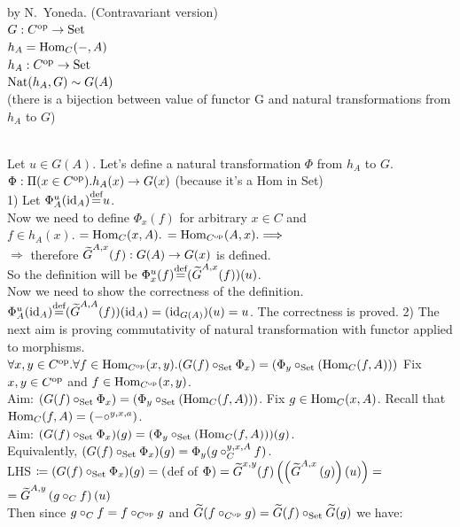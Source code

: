 \documentclass[10pt,a4paper]{article}
\begin{document}
\myqed
\begin{lemma}{by N.~Yoneda. (Contravariant version)}\\
$G : C^{\textrm{op}} \to {\textrm{Set}}$\\
$h_A = {\textrm{Hom}}_C(-,A)$\\
$h_A : C^{\textrm{op}} \to {\textrm{Set}}$\\
${\textrm{Nat}}(h_A,G)\sim G(A)$\\
(there is a bijection between value of functor G and natural transformations from $h_A$ to $G$)
\end{lemma}
\myprf\\
Let $u\in G(A)$. Let's define a natural transformation $\Phi$ from $h_A$ to $G$.\\
$\Phi:\Pi(x\in C^{\textrm{op}}).h_A(x)\to G(x)$ (because it's a Hom in Set)\\
1) Let $\Phi^u_A({\textrm{id}}_A){\stackrel{{\textrm{def}}}{=}} u$. \\
Now we need to define $\Phi_x(f)$ for arbitrary $x\in C$ and\\
$f\in h_A(x).$ $={\textrm{Hom}}_C(x,A).$ $={\textrm{Hom}}_{C^{\textrm{op}}}(A,x). \Longrightarrow$\\
$\Longrightarrow$ therefore ${\widetilde{G}\textrm{}} ^{A,x}(f):G(A)\to G(x)$ is defined.\\
So the definition will be $\Phi^u_x(f){\stackrel{{\textrm{def}}}{=}} ({\widetilde{G}\textrm{}}^{A,x}(f))(u)$.\\
Now we need to show the correctness of the definition.\\
$\Phi^u_A({\textrm{id}}_A){\stackrel{{\textrm{def}}}{=}} ({\widetilde{G}\textrm{}}^{A,A}(f))({\textrm{id}}_A) = ({\textrm{id}}_{G(A)})(u) = u$. The correctness is proved.
2) The next aim is proving commutativity of natural transformation with functor applied to morphisms.\\
$\forall x,y\in C^{\textrm{op}}.\forall f\in {\textrm{Hom}}_{C^{\textrm{op}}}(x,y).(G(f)\circ_{\textrm{Set}} \Phi_x) = (\Phi_y \circ_{\textrm{Set}} ({\textrm{Hom}}_C(f,A)))$
Fix  $x,y\in C^{\textrm{op}}$ and $f\in {\textrm{Hom}}_{C^{\textrm{op}}}(x,y)$.\\
Aim: $(G(f)\circ_{\textrm{Set}} \Phi_x) = (\Phi_y \circ_{\textrm{Set}} ({\textrm{Hom}}_C(f,A)))$.
Fix $g\in {\textrm{Hom}}_C(x,A)$. Recall that ${\textrm{Hom}}_C(f,A)=(-\circ^{y,x,a})$.\\
Aim: $(G(f)\circ_{\textrm{Set}} \Phi_x)(g) = (\Phi_y \circ_{\textrm{Set}} ({\textrm{Hom}}_C(f,A)))(g)$.\\
Equivalently, $(G(f)\circ_{\textrm{Set}} \Phi_x)(g) = \Phi_y (g\circ_C^{y,x,A} f)$.\\
LHS $\coloneqq (G(f)\circ_{\textrm{Set}} \Phi_x)(g) =($def of $\Phi)= {\widetilde{G}\textrm{}}^{x,y}(f)\left(\left({\widetilde{G}\textrm{}}^{A,x}\left(g\right)\right)\left(u\right)\right) =$\\
$ ={\widetilde{G}\textrm{}}^{A,y}\left(g\circ_C f\right)(u)$\\
Then since $g\circ_C f = f\circ_{C^{\textrm{op}}} g$ and ${\widetilde{G}\textrm{}}(f\circ_{C^{\textrm{op}}} g)=  {\widetilde{G}\textrm{}}(f)\circ_{\textrm{Set}} {\widetilde{G}\textrm{}}(g)$ we have:\\
\end{document}
